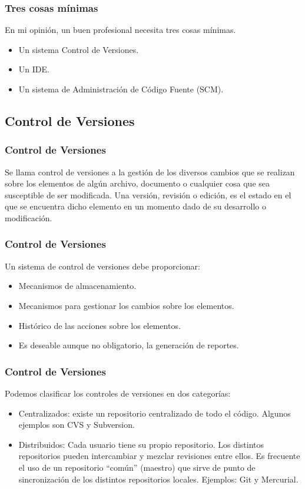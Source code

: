 \documentclass[12pt]{beamer}
\begin{document}
\begin{frame}
 \frametitle{Tres cosas mínimas}
 En mi opinión, un buen profesional necesita tres cosas mínimas.
 \begin{itemize}
  \item<2-> Un sistema Control de Versiones.
  \item<3-> Un IDE.
  \item<4-> Un sistema de Administración de Código Fuente (SCM).
 \end{itemize}
\end{frame}

\subsection{Control de Versiones}

\begin{frame}
 \frametitle{Control de Versiones}
 Se llama control de versiones a la gestión de los diversos cambios que se realizan sobre los elementos de algún archivo, documento o cualquier cosa que sea susceptible de ser modificada. Una versión, revisión o edición, es el estado en el que se encuentra dicho elemento en un momento dado de su desarrollo o modificación.
\end{frame}


\begin{frame}
 \frametitle{Control de Versiones}
 Un sistema de control de versiones debe proporcionar:
 \begin{itemize}
  \item<2-> Mecanismos de almacenamiento.
  \item<3-> Mecanismos para gestionar los cambios sobre los elementos.
  \item<4-> Histórico de las acciones sobre los elementos.
  \item<5-> Es deseable aunque no obligatorio, la generación de reportes.
 \end{itemize}
\end{frame}


\begin{frame}
 \frametitle{Control de Versiones}
 Podemos clasificar los controles de versiones en dos categorías:
 \begin{itemize}
  \item<2-> \alert{Centralizados}: existe un repositorio centralizado de todo el código. Algunos ejemplos son CVS y Subversion.
  \item<3-> \alert{Distribuidos}: Cada usuario tiene su propio repositorio. Los distintos repositorios pueden intercambiar y mezclar revisiones entre ellos. Es frecuente el uso de un repositorio ``común'' (maestro) que sirve de punto de sincronización de los distintos repositorios locales. Ejemplos: Git y Mercurial.
 \end{itemize}
\end{frame}
\end{document}
